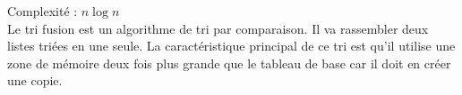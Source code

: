 \label{MergeSort}
\footnotesize 
\noindent
Complexité :  $ n\log n$
\\
\normalsize
Le tri fusion est un algorithme de tri par comparaison. Il va rassembler deux listes triées en une seule. La caractéristique principal de ce tri est qu'il utilise une zone de mémoire deux fois plus grande que le tableau de base car il doit en créer une copie. 